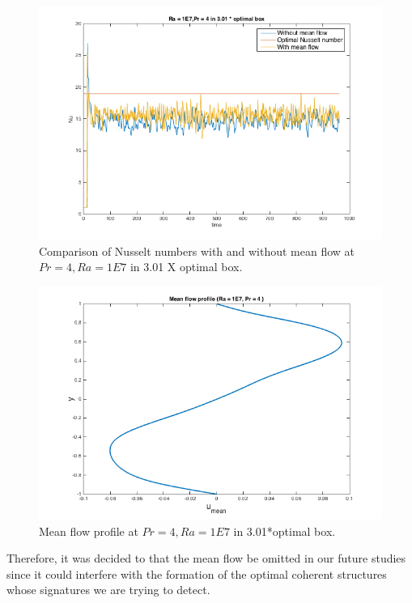 \documentclass[12pt]{article}
\begin{document}
     \begin{figure}[!htb]
     	\includegraphics[width=\linewidth]{Nu1E74301opt.png}
     	\caption{Comparison of Nusselt numbers with and without mean flow at $Pr = 4, Ra = 1E7$ in 3.01 X optimal box.}
     	\label{fig:fig1}
     \end{figure}
     
     \begin{figure}[!htb]
     	\includegraphics[width=\linewidth]{umean.png}
     	\caption{Mean flow profile at $Pr = 4, Ra = 1E7$ in 3.01*optimal box.}
     	\label{fig:fig1}
     \end{figure}
     
     Therefore, it was decided to that the mean flow be omitted in our future studies since it could interfere with the formation of the optimal coherent structures whose signatures we are trying to detect.
     
\end{document}

